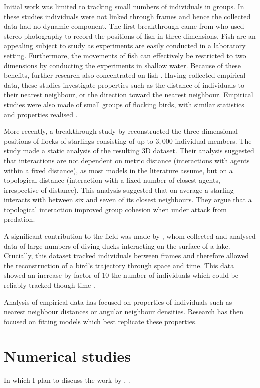 Initial work was limited to tracking small numbers of individuals in groups. In these studies individuals were not linked through frames and hence the collected data had no dynamic component. The first breakthrough came from \citet{cullen65} who used stereo photography to record the positions of fish in three dimensions. Fish are an appealing subject to study as experiments are easily conducted in a laboratory setting. Furthermore, the movements of fish can effectively be restricted to two dimensions by conducting the experiments in shallow water. Because of these benefits, further research also concentrated on fish \citep{van_long85, partridge80}. Having collected empirical data, these studies investigate properties such as the distance of individuals to their nearest neighbour, or the direction toward the nearest neighbour. Empirical studies were also made of small groups of flocking birds, with similar statistics and properties realised \citep{major78, budgey98}.

More recently, a breakthrough study by \citet{ballerini08} reconstructed the three dimensional positions of flocks of starlings consisting of up to $3,000$ individual members. The study made a static analysis of the resulting 3D dataset. Their analysis suggested that interactions are not dependent on metric distance (interactions with agents within a fixed distance), as most models in the literature assume, but on a topological distance (interaction with a fixed number of closest agents, irrespective of distance). This analysis suggested that on average a starling interacts with between six and seven of its closest neighbours. They argue that a topological interaction improved group cohesion when under attack from predation.

A significant contribution to the field was made by \citet{lukeman10}, whom collected and analysed data of large numbers of diving ducks interacting on the surface of a lake. Crucially, this dataset tracked individuals between frames and therefore allowed the reconstruction of a bird's trajectory through space and time. This data showed an increase by factor of $10$ the number of individuals which could be reliably tracked though time \citep{lukeman09}.

Analysis of empirical data has focused on properties of individuals such as nearest neighbour distances or angular neighbour densities. Research has then focused on fitting models which best replicate these properties.

\section{Numerical studies}
\label{sec:numerical_studies}

\color{red} In which I plan to discuss the work by \citet{mann11}, \citet{ballerini}. \color{black}
